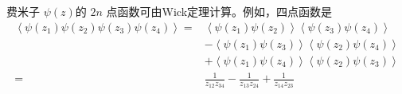 费米子 $\psi(z) $的 $2n$ 点函数可由Wick定理计算。例如，四点函数是
\begin{equation}
	\begin{aligned} \left\langle\psi\left(z_{1}\right) \psi\left(z_{2}\right) \psi\left(z_{3}\right) \psi\left(z_{4}\right)\right\rangle=&\left\langle\psi\left(z_{1}\right) \psi\left(z_{2}\right)\right\rangle\left\langle\psi\left(z_{3}\right) \psi\left(z_{4}\right)\right\rangle \\ &-\left\langle\psi\left(z_{1}\right) \psi\left(z_{3}\right)\right\rangle\left\langle\psi\left(z_{2}\right) \psi\left(z_{4}\right)\right\rangle \\ &+\left\langle\psi\left(z_{1}\right) \psi\left(z_{4}\right)\right\rangle\left\langle\psi\left(z_{2}\right) \psi\left(z_{3}\right)\right\rangle \\ =& \frac{1}{z_{12} z_{34}}-\frac{1}{z_{13} z_{24}}+\frac{1}{z_{14} z_{23}} \end{aligned}
\end{equation}

